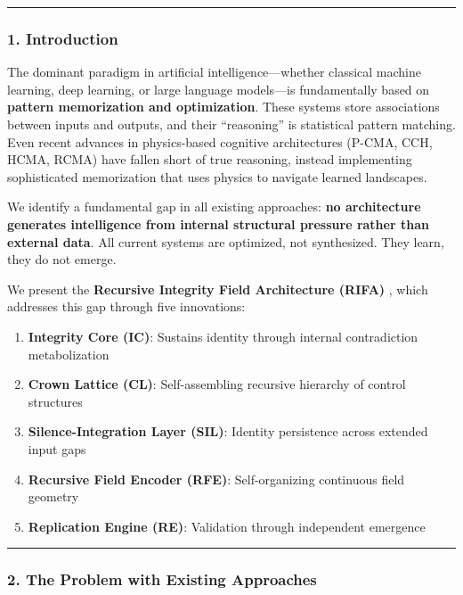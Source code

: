 \documentclass[
  11pt,
  a4paper,
]{article}
\providecommand{\tightlist}{%
  \setlength{\itemsep}{0pt}\setlength{\parskip}{0pt}}
\begin{document}
\begin{center}\rule{0.5\linewidth}{0.5pt}\end{center}

\subsubsection{1. Introduction}\label{introduction-5}

The dominant paradigm in artificial intelligence---whether classical
machine learning, deep learning, or large language models---is
fundamentally based on \textbf{pattern memorization and optimization}.
These systems store associations between inputs and outputs, and their
``reasoning'' is statistical pattern matching. Even recent advances in
physics-based cognitive architectures (P-CMA, CCH, HCMA, RCMA) have
fallen short of true reasoning, instead implementing sophisticated
memorization that uses physics to navigate learned landscapes.

We identify a fundamental gap in all existing approaches: \textbf{no
architecture generates intelligence from internal structural pressure
rather than external data}. All current systems are optimized, not
synthesized. They learn, they do not emerge.

We present the \textbf{Recursive Integrity Field Architecture (RIFA)} ,
which addresses this gap through five innovations:

\begin{enumerate}
\def\labelenumi{\arabic{enumi}.}
\tightlist
\item
  \textbf{Integrity Core (IC)}: Sustains identity through internal
  contradiction metabolization
\item
  \textbf{Crown Lattice (CL)}: Self-assembling recursive hierarchy of
  control structures
\item
  \textbf{Silence-Integration Layer (SIL)}: Identity persistence across
  extended input gaps
\item
  \textbf{Recursive Field Encoder (RFE)}: Self-organizing continuous
  field geometry
\item
  \textbf{Replication Engine (RE)}: Validation through independent
  emergence
\end{enumerate}

\begin{center}\rule{0.5\linewidth}{0.5pt}\end{center}

\subsubsection{2. The Problem with Existing
Approaches}\label{the-problem-with-existing-approaches}
\end{document}
